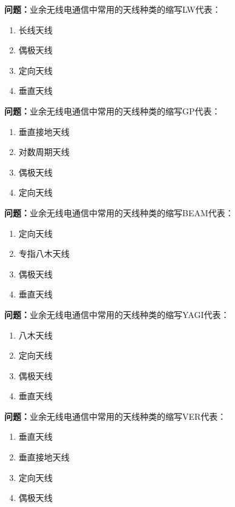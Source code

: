 \noindent\textbf{问题：}业余无线电通信中常用的天线种类的缩写LW代表：
\begin{enumerate}[label=\Alph*), leftmargin=3em]
\item 长线天线
\item 偶极天线
\item 定向天线
\item 垂直天线
\end{enumerate}

\bigskip


\noindent\textbf{问题：}业余无线电通信中常用的天线种类的缩写GP代表：
\begin{enumerate}[label=\Alph*), leftmargin=3em]
\item 垂直接地天线
\item 对数周期天线
\item 偶极天线
\item 定向天线
\end{enumerate}

\bigskip


\noindent\textbf{问题：}业余无线电通信中常用的天线种类的缩写BEAM代表：
\begin{enumerate}[label=\Alph*), leftmargin=3em]
\item 定向天线
\item 专指八木天线
\item 偶极天线
\item 垂直天线
\end{enumerate}

\bigskip


\noindent\textbf{问题：}业余无线电通信中常用的天线种类的缩写YAGI代表：
\begin{enumerate}[label=\Alph*), leftmargin=3em]
\item 八木天线
\item 定向天线
\item 偶极天线
\item 垂直天线
\end{enumerate}

\bigskip


\noindent\textbf{问题：}业余无线电通信中常用的天线种类的缩写VER代表：
\begin{enumerate}[label=\Alph*), leftmargin=3em]
\item 垂直天线
\item 垂直接地天线
\item 定向天线
\item 偶极天线
\end{enumerate}

